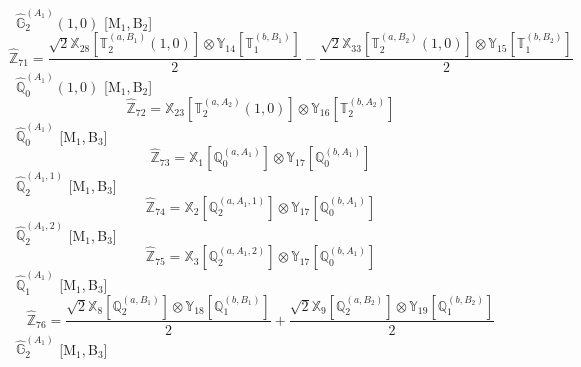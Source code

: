 \documentclass[fleqn,10pt,landscape]{article}
\begin{document}
\begin{itemize}
\begin{dmath*}
\end{dmath*}
\vspace{4mm}
\noindent {} $\,\,\,\hat{\mathbb{G}}_{2}^{(A_{1})}(1,0)$ [M$_{1}$,\,B$_{2}$]
\begin{dmath*}
\hat{\mathbb{Z}}_{71}=\frac{\sqrt{2} \mathbb{X}_{28}[\mathbb{T}_{2}^{(a,B_{1})}(1,0)] \otimes\mathbb{Y}_{14}[\mathbb{T}_{1}^{(b,B_{1})}]}{2} - \frac{\sqrt{2} \mathbb{X}_{33}[\mathbb{T}_{2}^{(a,B_{2})}(1,0)] \otimes\mathbb{Y}_{15}[\mathbb{T}_{1}^{(b,B_{2})}]}{2}
\end{dmath*}
\vspace{4mm}
\noindent {} $\,\,\,\hat{\mathbb{Q}}_{0}^{(A_{1})}(1,0)$ [M$_{1}$,\,B$_{2}$]
\begin{dmath*}
\hat{\mathbb{Z}}_{72}=\mathbb{X}_{23}[\mathbb{T}_{2}^{(a,A_{2})}(1,0)] \otimes\mathbb{Y}_{16}[\mathbb{T}_{2}^{(b,A_{2})}]
\end{dmath*}
\vspace{4mm}
\noindent {} $\,\,\,\hat{\mathbb{Q}}_{0}^{(A_{1})}$ [M$_{1}$,\,B$_{3}$]
\begin{dmath*}
\hat{\mathbb{Z}}_{73}=\mathbb{X}_{1}[\mathbb{Q}_{0}^{(a,A_{1})}] \otimes\mathbb{Y}_{17}[\mathbb{Q}_{0}^{(b,A_{1})}]
\end{dmath*}
\vspace{4mm}
\noindent {} $\,\,\,\hat{\mathbb{Q}}_{2}^{(A_{1},1)}$ [M$_{1}$,\,B$_{3}$]
\begin{dmath*}
\hat{\mathbb{Z}}_{74}=\mathbb{X}_{2}[\mathbb{Q}_{2}^{(a,A_{1},1)}] \otimes\mathbb{Y}_{17}[\mathbb{Q}_{0}^{(b,A_{1})}]
\end{dmath*}
\vspace{4mm}
\noindent {} $\,\,\,\hat{\mathbb{Q}}_{2}^{(A_{1},2)}$ [M$_{1}$,\,B$_{3}$]
\begin{dmath*}
\hat{\mathbb{Z}}_{75}=\mathbb{X}_{3}[\mathbb{Q}_{2}^{(a,A_{1},2)}] \otimes\mathbb{Y}_{17}[\mathbb{Q}_{0}^{(b,A_{1})}]
\end{dmath*}
\vspace{4mm}
\noindent {} $\,\,\,\hat{\mathbb{Q}}_{1}^{(A_{1})}$ [M$_{1}$,\,B$_{3}$]
\begin{dmath*}
\hat{\mathbb{Z}}_{76}=\frac{\sqrt{2} \mathbb{X}_{8}[\mathbb{Q}_{2}^{(a,B_{1})}] \otimes\mathbb{Y}_{18}[\mathbb{Q}_{1}^{(b,B_{1})}]}{2} + \frac{\sqrt{2} \mathbb{X}_{9}[\mathbb{Q}_{2}^{(a,B_{2})}] \otimes\mathbb{Y}_{19}[\mathbb{Q}_{1}^{(b,B_{2})}]}{2}
\end{dmath*}
\vspace{4mm}
\noindent {} $\,\,\,\hat{\mathbb{G}}_{2}^{(A_{1})}$ [M$_{1}$,\,B$_{3}$]

\end{itemize}
\end{document}
